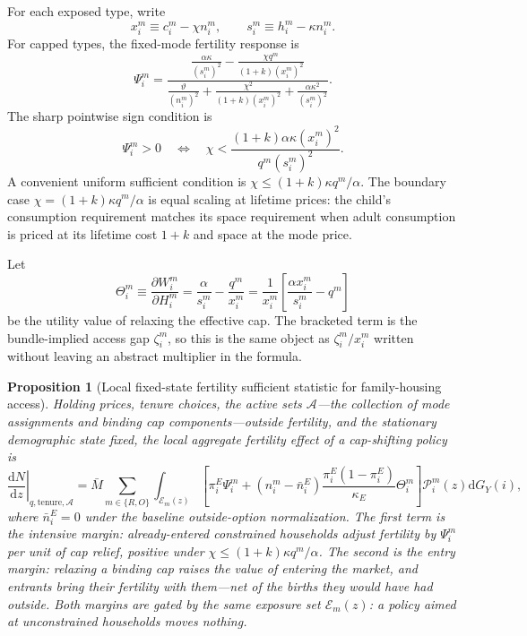 \documentclass[11pt]{article}
\newtheorem{proposition}{Proposition}
\newcommand{\dd}{\mathrm d}
\newcommand{\1}{\mathbf 1}
\begin{document}
For each exposed type, write
\[
x_i^m\equiv c_i^m-\chi n_i^m,
\qquad
s_i^m\equiv h_i^m-\kappa n_i^m.
\]
For capped types, the fixed-mode fertility response is
\[
\Psi_i^m
=
\frac{
\frac{\alpha\kappa}{(s_i^m)^2}
-
\frac{\chi q^m}{(1+k)(x_i^m)^2}
}{
\frac{\vartheta}{(n_i^m)^2}
+
\frac{\chi^2}{(1+k)(x_i^m)^2}
+
\frac{\alpha\kappa^2}{(s_i^m)^2}
}.
\]
The sharp pointwise sign condition is
\[
\Psi_i^m>0
\quad\Longleftrightarrow\quad
\chi<
\frac{(1+k)\alpha\kappa(x_i^m)^2}{q^m(s_i^m)^2}.
\]
A convenient uniform sufficient condition is $\chi\le (1+k)\kappa q^m/\alpha$. The boundary case $\chi=(1+k)\kappa q^m/\alpha$ is equal scaling at lifetime prices: the child's consumption requirement matches its space requirement when adult consumption is priced at its lifetime cost $1+k$ and space at the mode price.

Let
\[
\Theta_i^m
\equiv
\frac{\partial W_i^m}{\partial H_i^m}
=
\frac{\alpha}{s_i^m}-\frac{q^m}{x_i^m}
=
\frac{1}{x_i^m}
\left[
\frac{\alpha x_i^m}{s_i^m}-q^m
\right]
\]
be the utility value of relaxing the effective cap. The bracketed term is the bundle-implied access gap $\zeta_i^m$, so this is the same object as $\zeta_i^m/x_i^m$ written without leaving an abstract multiplier in the formula.

\begin{proposition}[Local fixed-state fertility sufficient statistic for family-housing access]
\label{prop:local_fertility_ss}
Holding prices, tenure choices, the active sets $\mathcal A$---the collection of mode assignments and binding cap components---outside fertility, and the stationary demographic state fixed, the local aggregate fertility effect of a cap-shifting policy is
\[
\left.\frac{\dd N}{\dd z}\right|_{q,\mathrm{tenure},\mathcal A}
=
\bar M
\sum_{m\in\{R,O\}}
\int_{\mathcal E_m(z)}
\left[
\pi_i^E\Psi_i^m
+
(n_i^m-\bar n_i^E)
\frac{\pi_i^E(1-\pi_i^E)}{\kappa_E}
\Theta_i^m
\right]
\mathcal P_i^m(z)
\dd G_Y(i),
\]
where $\bar n_i^E=0$ under the baseline outside-option normalization. The first term is the intensive margin: already-entered constrained households adjust fertility by $\Psi_i^m$ per unit of cap relief, positive under $\chi\le(1+k)\kappa q^m/\alpha$. The second is the entry margin: relaxing a binding cap raises the value of entering the market, and entrants bring their fertility with them---net of the births they would have had outside. Both margins are gated by the same exposure set $\mathcal E_m(z)$: a policy aimed at unconstrained households moves nothing.
\end{proposition}
\end{document}
